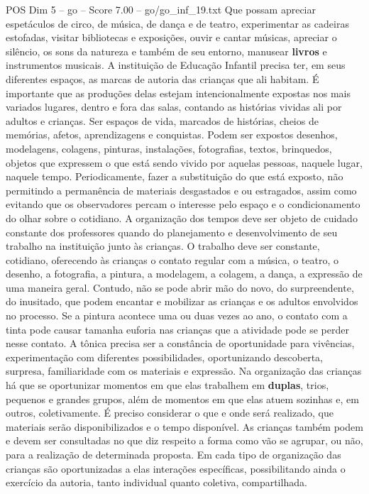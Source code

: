 \begin{textsample}{POS Dim 5 – go – Score 7.00 – go/go\_inf\_19.txt}
Que possam apreciar espetáculos de circo, de música, de dança e de teatro, experimentar as cadeiras estofadas, visitar bibliotecas e exposições, ouvir e cantar músicas, apreciar o silêncio, os sons da natureza e também de seu entorno, manusear \textbf{livros} e instrumentos musicais.
A instituição de Educação Infantil precisa ter, em seus diferentes espaços, as marcas de autoria das crianças que ali habitam.
É importante que as produções delas estejam intencionalmente expostas nos mais variados lugares, dentro e fora das salas, contando as histórias vividas ali por adultos e crianças.
Ser espaços de vida, marcados de histórias, cheios de memórias, afetos, aprendizagens e conquistas.
Podem ser expostos desenhos, modelagens, colagens, pinturas, instalações, fotografias, textos, brinquedos, objetos que expressem o que está sendo vivido por aquelas pessoas, naquele lugar, naquele tempo.
Periodicamente, fazer a substituição do que está exposto, não permitindo a permanência de materiais desgastados e ou estragados, assim como evitando que os observadores percam o interesse pelo espaço e o condicionamento do olhar sobre o cotidiano.
A organização dos tempos deve ser objeto de cuidado constante dos professores quando do planejamento e desenvolvimento de seu trabalho na instituição junto às crianças.
O trabalho deve ser constante, cotidiano, oferecendo às crianças o contato regular com a música, o teatro, o desenho, a fotografia, a pintura, a modelagem, a colagem, a dança, a expressão de uma maneira geral.
Contudo, não se pode abrir mão do novo, do surpreendente, do inusitado, que podem encantar e mobilizar as crianças e os adultos envolvidos no processo.
Se a pintura acontece uma ou duas vezes ao ano, o contato com a tinta pode causar tamanha euforia nas crianças que a atividade pode se perder nesse contato.
A tônica precisa ser a constância de oportunidade para vivências, experimentação com diferentes possibilidades, oportunizando descoberta, surpresa, familiaridade com os materiais e expressão.
Na organização das crianças há que se oportunizar momentos em que elas trabalhem em \textbf{duplas}, trios, pequenos e grandes grupos, além de momentos em que elas atuem sozinhas e, em outros, coletivamente.
É preciso considerar o que e onde será realizado, que materiais serão disponibilizados e o tempo disponível.
As crianças também podem e devem ser consultadas no que diz respeito a forma como vão se agrupar, ou não, para a realização de determinada proposta.
Em cada tipo de organização das crianças são oportunizadas a elas interações específicas, possibilitando ainda o exercício da autoria, tanto individual quanto coletiva, compartilhada.

\end{textsample}
